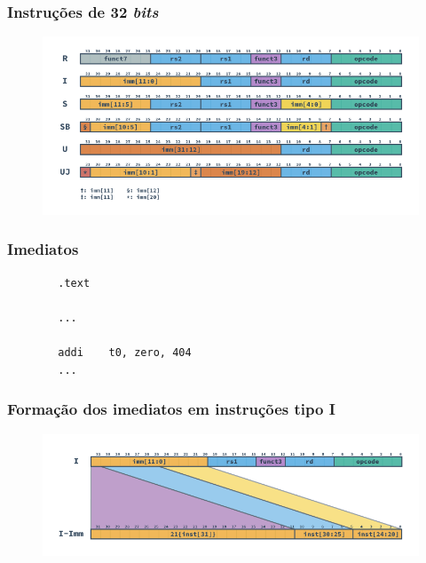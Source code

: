 \documentclass[aspectratio=169]{beamer}
\begin{document}
    \begin{frame}
        \frametitle{Instruções de 32 \textit{bits}}
        \vfill
        \begin{figure}[H]
        \centering
            \includegraphics[width=.9\textwidth,height=.9\textheight,keepaspectratio]{../images/RV_Formats.png}
        \end{figure}
        \vfill
    \end{frame}

    \begin{frame}[fragile]
        \frametitle{Imediatos}
        \vfill
        \begin{lstlisting}
        .text

        ...

        addi    t0, zero, 404
        ...
        \end{lstlisting}
        \vfill
    \end{frame}

    \begin{frame}
        \frametitle{Formação dos imediatos em instruções tipo \textbf{I}}
        \vfill
        \begin{figure}[H]
        \centering
            \includegraphics[width=.9\textwidth,height=.9\textheight,keepaspectratio]{../images/RV_I_Imm.png}
        \end{figure}
        \vfill
    \end{frame}
\end{document}
